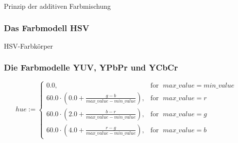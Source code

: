 \documentclass[a4paper,12pt,abstracton,titlepage]{scrartcl}
\begin{document}


\begin{floatingfigure}[l]{5.3cm}
	\caption{Prinzip der additiven Farbmischung}
	\label{venn}
\end{floatingfigure}

\par



\vspace{2em}

\subsubsection{Das Farbmodell HSV}
\begin{floatingfigure}[r]{8.3cm}
	\caption{HSV-Farbkörper}
	\label{hsv}
\end{floatingfigure} 


\vspace{1em}
\subsubsection{Die Farbmodelle YUV, YPbPr und YCbCr}

\[    hue := \left\{\begin{array}{lr}
        0.0, & \text{for }\; max\_value = min\_value\\
        60.0 \cdot \left( 0.0 + \frac {g - b} {max\_value - min\_value} \right), & \text{for }\; max\_value = r\\
        60.0 \cdot \left( 2.0 + \frac {b - r} {max\_value - min\_value} \right), & \text{for }\; max\_value = g\\
        60.0 \cdot \left( 4.0 + \frac {r - g} {max\_value - min\_value} \right), & \text{for }\; max\_value = b
        \end{array}\right.
  \]  
\end{document}
